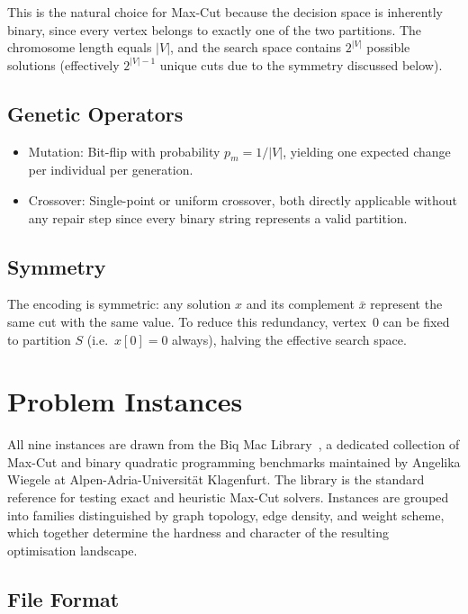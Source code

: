 \documentclass[12pt]{article}
\begin{document}
This is the natural choice for Max-Cut because the decision space is inherently binary, since every vertex belongs to exactly one of the two partitions.
The chromosome length equals $|V|$, and the search space contains $2^{|V|}$ possible
solutions (effectively $2^{|V|-1}$ unique cuts due to the symmetry discussed below).
 
\subsection{Genetic Operators}
 
\begin{itemize}
    \item Mutation: Bit-flip with probability $p_m = 1/|V|$, yielding one
          expected change per individual per generation.
    \item Crossover: Single-point or uniform crossover, both directly applicable
          without any repair step since every binary string represents a valid partition.
\end{itemize}
 
\subsection{Symmetry}
 
The encoding is symmetric: any solution $x$ and its complement $\bar{x}$ represent
the same cut with the same value. To reduce this redundancy, vertex~0 can be fixed to
partition $S$ (i.e.\ $x[0] = 0$ always), halving the effective search space.
 
\section{Problem Instances}

All nine instances are drawn from the Biq Mac Library~\cite{biqmac}, a dedicated
collection of Max-Cut and binary quadratic programming benchmarks maintained by
Angelika Wiegele at Alpen-Adria-Universität Klagenfurt.
The library is the standard reference for testing exact and heuristic Max-Cut solvers. Instances are grouped into families distinguished by graph topology, edge density,
and weight scheme, which together determine the hardness and character of the
resulting optimisation landscape.

\subsection{File Format}
\end{document}
